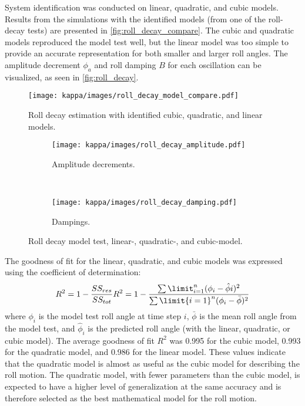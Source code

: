 System identification was conducted on linear, quadratic, and cubic models. Results from the simulations with the identified models (from one of the roll-decay tests) are presented in \autoref{fig:roll_decay_compare}. The cubic and quadratic models reproduced the model test well, but the linear model was too simple to provide an accurate representation for both smaller and larger roll angles. 
The amplitude decrement $\phi_a$ and roll damping $B$ for each oscillation can be visualized, as seen in \autoref{fig:roll_decay}.
\begin{figure}[h!] \centering \texttt{[image: kappa/images/roll\_decay\_model\_compare.pdf]} \caption{Roll decay estimation with identified cubic, quadratic, and linear models.} \label{fig:roll_decay_compare} \end{figure}
\begin{figure}[h!] \begin{subfigure}[b]{0.45\textwidth} \centering \texttt{[image: kappa/images/roll\_decay\_amplitude.pdf]} \caption{Amplitude decrements.} \label{fig:roll_decay_amplitude} \end{subfigure} ~ %
\begin{subfigure}[b]{0.45\textwidth} \centering \texttt{[image: kappa/images/roll\_decay\_damping.pdf]} \caption{Dampings.} \label{fig:roll_decay_damping} \end{subfigure} \caption{Roll decay model test, linear-, quadratic-, and cubic-model.} \label{fig:roll_decay} \end{figure}

The goodness of fit for the linear, quadratic, and cubic models was expressed using the coefficient of determination: 
\begin{equation} \label{eq:R2} 
R^2=1-\frac{SS_{res}}{SS_{tot}} R^2=1-\frac{\sum\limit_{i=1}^{n}(\phi_{i}-\hat{\phi}i)^2}{\sum\limit{i=1}^{n}(\phi_i-\bar \phi)^2} 
\end{equation} 
where $\phi_i$ is the model test roll angle at time step $i$, $\bar \phi$ is the mean roll angle from the model test, and $\hat{\phi}_i$ is the predicted roll angle (with the linear, quadratic, or cubic model). The average goodness of fit $R^2$ was 0.995 for the cubic model, 0.993 for the quadratic model, and 0.986 for the linear model. These values indicate that the quadratic model is almost as useful as the cubic model for describing the roll motion. The quadratic model, with fewer parameters than the cubic model, is expected to have a higher level of generalization at the same accuracy and is therefore selected as the best mathematical model for the roll motion.